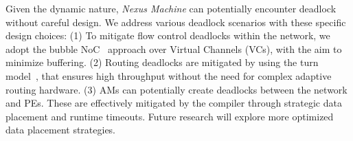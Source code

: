 Given the dynamic nature, \textit{Nexus Machine} can potentially encounter deadlock without careful design. We address various deadlock scenarios with these specific design choices: 
(1) To mitigate flow control deadlocks within the network, we adopt the bubble NoC~\cite{bubble_flow} approach over Virtual Channels (VCs), with the aim to minimize buffering. 
(2) Routing deadlocks are mitigated by using the turn model~\cite{noc_peh}, that ensures high throughput without the need for complex adaptive routing hardware.
(3) AMs can potentially create deadlocks between the network and PEs. 
These are effectively mitigated by the compiler through strategic data placement and runtime timeouts.
Future research will explore more optimized data placement strategies.